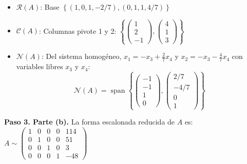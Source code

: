 \begin{example}
\begin{myproof}
\begin{itemize}
    \item $\mathcal{R}(A)$: Base $\left\{ (1, 0, 1, -2/7), (0, 1, 1, 4/7) \right\}$
    \item $\mathcal{C}(A)$: Columnas pivote 1 y 2: $\left\{ \begin{pmatrix}1\\2\\-1\end{pmatrix}, \begin{pmatrix}4\\1\\3\end{pmatrix} \right\}$
    \item $\mathcal{N}(A)$: Del sistema homogéneo, $x_1 = -x_3 + \tfrac{2}{7}x_4$ y $x_2 = -x_3 - \tfrac{4}{7}x_4$ con variables libres $x_3$ y $x_4$:
    $$\mathcal{N}(A) = \operatorname{span}\left\{ \begin{pmatrix}-1\\-1\\1\\0\end{pmatrix}, \begin{pmatrix}2/7\\-4/7\\0\\1\end{pmatrix} \right\}$$
\end{itemize}

\textbf{Paso 3. Parte (b).} La forma escalonada reducida de $A$ es: $A \sim \begin{pmatrix} 1 & 0 & 0 & 0 & 114 \\ 0 & 1 & 0 & 0 & 51 \\ 0 & 0 & 1 & 0 & 3 \\ 0 & 0 & 0 & 1 & -48 \end{pmatrix}$


\end{myproof}
\end{example}
